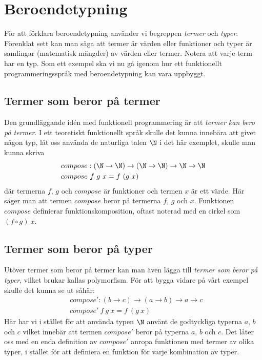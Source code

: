 \section{Beroendetypning}
För att förklara beroendetypning använder vi begreppen \emph{termer} och
\emph{typer}. Förenklat sett kan man säga att termer är värden eller funktioner
och typer är samlingar (matematisk mängder) av värden eller termer. Notera att
varje term har en typ. Som ett exempel ska vi nu gå igenom hur ett
funktionellt programmeringsspråk med beroendetypning kan vara uppbyggt.

\subsection{Termer som beror på termer}
Den grundläggande idén med funktionell programmering är att \emph{termer kan
bero på termer}. I ett teoretiskt funktionellt språk skulle det kunna innebära
att givet någon typ, låt oss använda de naturliga talen $\N$ i det här
exemplet, skulle man kunna skriva
\begin{align*}
  &compose : (\N \to \N) \to (\N \to \N) \to \N \to \N \\
  &compose\ f\ g\ x = f\ (g\ x)
\end{align*}
där termerna $f$, $g$ och $compose$ är funktioner och termen $x$ är ett värde.
Här säger man att termen $compose$ beror på termerna $f$, $g$ och $x$.
Funktionen $compose$ definierar funktionskomposition, oftast noterad med en
cirkel som $(f \circ g)\ x$.


\subsection{Termer som beror på typer}
Utöver termer som beror på termer kan man även lägga till \emph{termer som
beror på typer}, vilket brukar kallas polymorfism. För att bygga vidare på vårt
exempel skulle det kunna se ut såhär:
\begin{align*}
  &compose' : (b \to c) \to (a \to b) \to a \to c \\
  &compose'\ f\ g\ x = f\ (g\ x)
\end{align*}
Här har vi i stället för att använda typen $\N$ använt de godtyckliga typerna
$a$, $b$ och $c$ vilket innebär att termen $compose'$ beror på typerna $a$, $b$
och $c$. Det låter oss med en enda definition av $compose'$ anropa funktionen
med termer av olika typer, i stället för att definiera en funktion för varje
kombination av typer.

